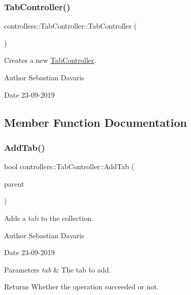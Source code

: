 \subsubsection{\texorpdfstring{Tab\+Controller()}{TabController()}}
{\footnotesize\ttfamily controllers\+::\+Tab\+Controller\+::\+Tab\+Controller (\begin{DoxyParamCaption}{ }\end{DoxyParamCaption})}

Creates a new \hyperlink{classcontrollers_1_1_tab_controller}{Tab\+Controller}. \begin{DoxyAuthor}{Author}
Sebastian Davaris 
\end{DoxyAuthor}
\begin{DoxyDate}{Date}
23-\/09-\/2019 
\end{DoxyDate}


\subsection{Member Function Documentation}
\mbox{\label{classcontrollers_1_1_tab_controller_ae937870bbca6c9cd3a240ae78b5a7377}} 
\subsubsection{\texorpdfstring{Add\+Tab()}{AddTab()}}
{\footnotesize\ttfamily bool controllers\+::\+Tab\+Controller\+::\+Add\+Tab (\begin{DoxyParamCaption}\item[{wx\+Window $\ast$}]{parent }\end{DoxyParamCaption})}

Adds a tab to the collection. \begin{DoxyAuthor}{Author}
Sebastian Davaris 
\end{DoxyAuthor}
\begin{DoxyDate}{Date}
23-\/09-\/2019 
\end{DoxyDate}

\begin{DoxyParams}{Parameters}
{\em tab} & The tab to add. \\
\hline
\end{DoxyParams}
\begin{DoxyReturn}{Returns}
Whether the operation succeeded or not. 
\end{DoxyReturn}
\mbox{\label{classcontrollers_1_1_tab_controller_a9b1538d67e2487edf7837daa806870f3}} 
